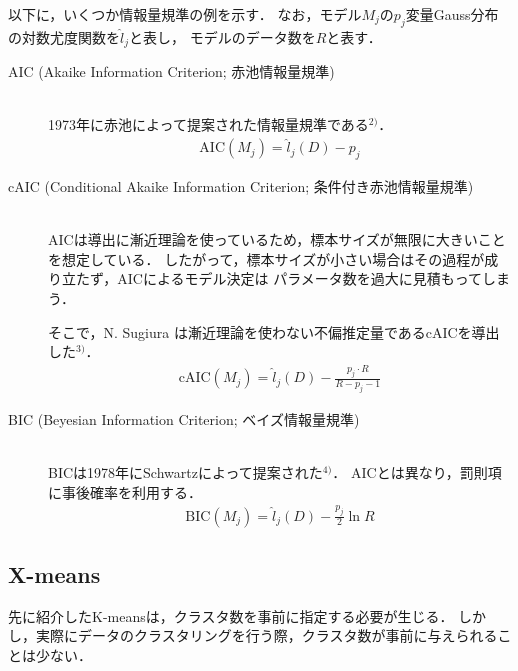 以下に，いくつか情報量規準の例を示す．
なお，モデル$M_j$の$p_j$変量Gauss分布の対数尤度関数を$\hat{l}_j$と表し，
モデルのデータ数を$R$と表す．
\begin{description}
  \item[AIC (Akaike Information Criterion; 赤池情報量規準)]~\\
    1973年に赤池によって提案された情報量規準である$^{2)}$．
    \begin{align}
      \label{eq:aic}
      \mathrm{AIC}(M_j) = \hat{l}_j(D) - p_j
    \end{align}
  \item[cAIC (Conditional Akaike Information Criterion; 条件付き赤池情報量規準)]~\\
    AICは導出に漸近理論を使っているため，標本サイズが無限に大きいことを想定している．
    したがって，標本サイズが小さい場合はその過程が成り立たず，AICによるモデル決定は
    パラメータ数を過大に見積もってしまう．

    そこで，N. Sugiura は漸近理論を使わない不偏推定量であるcAICを導出した$^{3)}$．
    \begin{align}
      \label{eq:caic}
      \mathrm{cAIC}(M_j) = \hat{l}_j(D) - \frac{p_j \cdot R}{R-p_j-1}
    \end{align}
  \item[BIC (Beyesian Information Criterion; ベイズ情報量規準)]~\\
    BICは1978年にSchwartzによって提案された$^{4)}$．
    AICとは異なり，罰則項に事後確率を利用する．
    \begin{align}
      \label{eq:bic}
      \mathrm{BIC}(M_j) = \hat{l}_j(D) - \frac{p_j}{2}\ln R
    \end{align}
\end{description}

\subsection{X-means}
先に紹介したK-meansは，クラスタ数を事前に指定する必要が生じる．
しかし，実際にデータのクラスタリングを行う際，クラスタ数が事前に与えられることは少ない．

